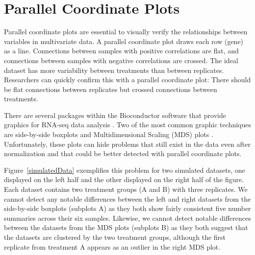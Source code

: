 \documentclass[11pt,a4paper,oldfontcommands,openany]{memoir}
\numberwithin{equation}{section} %
\begin{document}
\section{Parallel Coordinate Plots}

Parallel coordinate plots are essential to visually verify the relationships between variables in multivariate data. A parallel coordinate plot draws each row (gene) as a line. Connections between samples with positive correlations are flat, and connections between samples with negative correlations are crossed. The ideal dataset has more variability between treatments than between replicates. Researchers can quickly confirm this with a parallel coordinate plot: There should be flat connections between replicates but crossed connections between treatments.

There are several packages within the Bioconductor software that provide graphics for RNA-seq data analysis \citep{Huber}. Two of the most common graphic techniques are side-by-side boxplots and Multidimensional Scaling (MDS) plots \citep{Love, Risso, Robinson, Ritchie}. Unfortunately, these plots can hide problems that still exist in the data even after normalization and that could be better detected with parallel coordinate plots.

Figure~\ref{simulatedData} exemplifies this problem for two simulated datasets, one displayed on the left half and the other displayed on the right half of the figure. Each dataset contains two treatment groups (A and B) with three replicates. We cannot detect any notable differences between the left and right datasets from the side-by-side boxplots (subplots A) as they both show fairly consistent five number summaries across their six samples. Likewise, we cannot detect notable differences between the datasets from the MDS plots (subplots B) as they both suggest that the datasets are clustered by the two treatment groups, although the first replicate from treatment A appears as an outlier in the right MDS plot.
\end{document}
